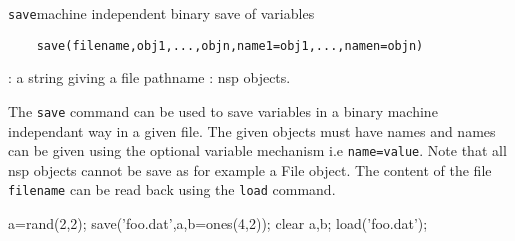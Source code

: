 \begin{mandesc}
  \texttt{save}{machine independent binary save of variables}
\end{mandesc}
\label{save}
\begin{calling_sequence}
  \begin{verbatim}
    save(filename,obj1,...,objn,name1=obj1,...,namen=objn)  
  \end{verbatim}
\end{calling_sequence}
\begin{parameters}
  \begin{varlist}
    : a string giving a file pathname 
    : nsp objects. 
  \end{varlist}
\end{parameters}
\begin{mandescription}
  The \verb!save! command can be used to save variables in a binary machine independant way 
  in a given file. The given objects must have names and names can be given using the optional 
  variable mechanism i.e \verb+name=value+. Note that all nsp objects cannot be save as for example 
  a File object. The content of the file \verb+filename+ can be read back using the \verb+load+ command.
\end{mandescription}
\begin{examples}
  \begin{program}
    a=rand(2,2);
    save('foo.dat',a,b=ones(4,2));
    clear a,b;
    load('foo.dat');
  \end{program}
\end{examples}
\begin{manseealso}
\end{manseealso}

